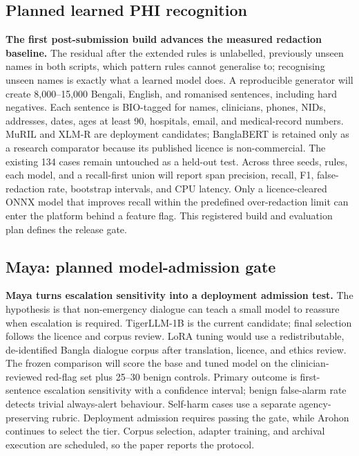 \documentclass[12pt,twocolumn,a4paper]{article}
\begin{document}
\subsection{Planned learned PHI recognition}

\textbf{The first post-submission build advances the measured redaction baseline.} The
residual after the extended rules is unlabelled, previously unseen names in both scripts, which
pattern rules cannot generalise to; recognising unseen names is exactly what a learned model
does. A reproducible generator will create 8,000--15,000 Bengali, English, and romanised
sentences, including hard negatives. Each sentence is BIO-tagged for names, clinicians, phones,
NIDs, addresses, dates, ages at least 90, hospitals, email, and medical-record numbers. MuRIL and XLM-R
are deployment candidates; BanglaBERT is retained only as a research comparator because its
published licence is non-commercial. The existing 134 cases remain untouched as a held-out
test. Across three seeds, rules, each model, and a recall-first union will report span
precision, recall, F1, false-redaction rate, bootstrap intervals, and CPU latency. Only a
licence-cleared ONNX model that improves recall within the predefined over-redaction limit
can enter the platform behind a feature flag. This registered build and evaluation plan
defines the release gate.

\subsection{Maya: planned model-admission gate}

\textbf{Maya turns escalation sensitivity into a deployment admission test.} The hypothesis is
that non-emergency dialogue can teach a small model to reassure when escalation is required.
TigerLLM-1B is the current candidate; final selection follows the licence and corpus review.
LoRA tuning would use a
redistributable, de-identified Bangla dialogue corpus after translation, licence, and ethics
review. The frozen comparison will score the base and tuned model on the clinician-reviewed
red-flag set plus 25--30 benign controls. Primary outcome is first-sentence escalation
sensitivity with a confidence interval; benign false-alarm rate detects trivial always-alert
behaviour. Self-harm cases use a separate agency-preserving rubric. Deployment admission
requires passing the gate, while Arohon continues to select the tier. Corpus selection,
adapter training, and archival execution are scheduled, so the paper reports the protocol.
\end{document}
